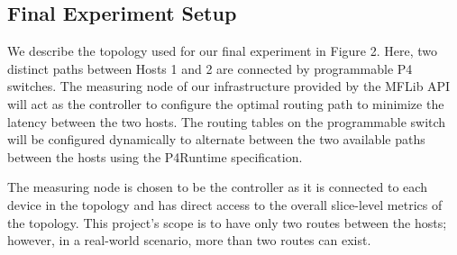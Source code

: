 \documentclass[conference]{IEEEtran}
\begin{document}
    \subsection{Final Experiment Setup}
    We describe the topology used for our final experiment in Figure 2. Here, two distinct paths between Hosts 1 and 2 are connected by programmable P4 switches. The measuring node of our infrastructure provided by the MFLib API will act as the controller to configure the optimal routing path to minimize the latency between the two hosts. The routing tables on the programmable switch will be configured dynamically to alternate between the two available paths between the hosts using the P4Runtime specification. 
    
    The measuring node is chosen to be the controller as it is connected to each device in the topology and has direct access to the overall slice-level metrics of the topology. This project's scope is to have only two routes between the hosts; however, in a real-world scenario, more than two routes can exist.
    
\end{document}
